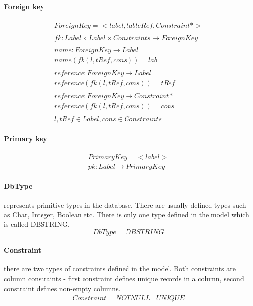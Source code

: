 \documentclass[11pt]{article}
\begin{document}
\paragraph{Foreign key}
\begin{gather*}
ForeignKey = <label, tableRef, Constraint*> \\ \\
fk : Label \times Label \times Constraints \rightarrow ForeignKey \\ \\
name : ForeignKey \rightarrow Label \\
name(fk(l, tRef, cons)) = lab  \\ \\
reference : ForeignKey \rightarrow Label  \\
reference(fk(l, tRef, cons)) = tRef  \\ \\
reference : ForeignKey \rightarrow Constraint*  \\
reference(fk(l, tRef, cons)) = cons  \\ \\
l, tRef \in Label, cons \in Constraints
\end{gather*}


\paragraph{Primary key}
\begin{gather*}
PrimaryKey =  < label > 	\\
pk : Label \rightarrow PrimaryKey
\end{gather*}

\paragraph{DbType} represents primitive types in the database. There are usually defined types such as Char, Integer, Boolean etc. There is only one type defined in the model which is called DBSTRING.
$$
DbType = DBSTRING
$$

\paragraph{Constraint} there are two types of constraints defined in the model. Both constraints are column constraints - first constraint defines unique records in a column, second constraint defines non-empty columns.
\begin{gather*}
Constraint = NOTNULL \; | \; UNIQUE 
\end{gather*}
\end{document}
